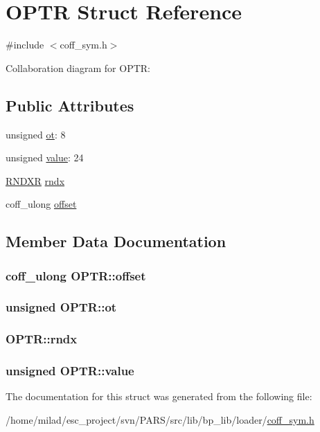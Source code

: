 \hypertarget{structOPTR}{
\section{OPTR Struct Reference}
\label{structOPTR}
}


{\ttfamily \#include $<$coff\_\-sym.h$>$}



Collaboration diagram for OPTR:
\subsection*{Public Attributes}
\begin{DoxyCompactItemize}
\item 
unsigned \hyperlink{structOPTR_a395372ba2e7eb725906f228749c39dd5}{ot}: 8
\item 
unsigned \hyperlink{structOPTR_a6539af4ff0b28e701633de620abfabbe}{value}: 24
\item 
\hyperlink{structRNDXR}{RNDXR} \hyperlink{structOPTR_a3894af1c17210c3c3e33577ef34161fa}{rndx}
\item 
coff\_\-ulong \hyperlink{structOPTR_af59ba1a417a747c35426cb6edd3c3a7a}{offset}
\end{DoxyCompactItemize}


\subsection{Member Data Documentation}
\hypertarget{structOPTR_af59ba1a417a747c35426cb6edd3c3a7a}{
\subsubsection[{offset}]{\setlength{\rightskip}{0pt plus 5cm}coff\_\-ulong {\bf OPTR::offset}}}
\label{structOPTR_af59ba1a417a747c35426cb6edd3c3a7a}
\hypertarget{structOPTR_a395372ba2e7eb725906f228749c39dd5}{
\subsubsection[{ot}]{\setlength{\rightskip}{0pt plus 5cm}unsigned {\bf OPTR::ot}}}
\label{structOPTR_a395372ba2e7eb725906f228749c39dd5}
\hypertarget{structOPTR_a3894af1c17210c3c3e33577ef34161fa}{
\subsubsection[{rndx}]{ {\bf OPTR::rndx}}}
\label{structOPTR_a3894af1c17210c3c3e33577ef34161fa}
\hypertarget{structOPTR_a6539af4ff0b28e701633de620abfabbe}{
\subsubsection[{value}]{\setlength{\rightskip}{0pt plus 5cm}unsigned {\bf OPTR::value}}}
\label{structOPTR_a6539af4ff0b28e701633de620abfabbe}


The documentation for this struct was generated from the following file:\begin{DoxyCompactItemize}
\item 
/home/milad/esc\_\-project/svn/PARS/src/lib/bp\_\-lib/loader/\hyperlink{coff__sym_8h}{coff\_\-sym.h}\end{DoxyCompactItemize}
